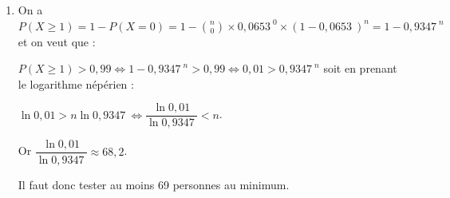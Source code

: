 \documentclass[10pt]{article}
\providecommand{\np}[2][]{{#2~#1}}
\begin{document}
\begin{enumerate}
\begin{enumerate}
$ 45 \times \np{0,0653}^2 \times 0,9347^{8} \approx \np{0,1118}$, soit $0,11$ à $10^{-2}$ près.
	\end{enumerate}
\item 
On a $P(X \geqslant 1) = 1 - P(X = 0) = 1 - \binom{n}{0} \times \np{0,0653}^0 \times (1 - \np{0,0653})^{n} = 1 - \np{0,9347}^n$ et on veut que :

$P(X \geqslant 1) > 0,99 \iff 1 - \np{0,9347}^{n} > 0,99 \iff 0,01 > \np{0,9347}^{n}$ soit en prenant le logarithme népérien :

$\ln 0,01 > n\ln \np{0,9347} \iff \dfrac{\ln 0,01}{\ln \np{0,9347}}< n$.

Or $\dfrac{\ln 0,01}{\ln \np{0,9347}} \approx 68,2$. 

Il faut donc tester au moins 69 personnes au minimum.
\end{enumerate}
\end{document}
